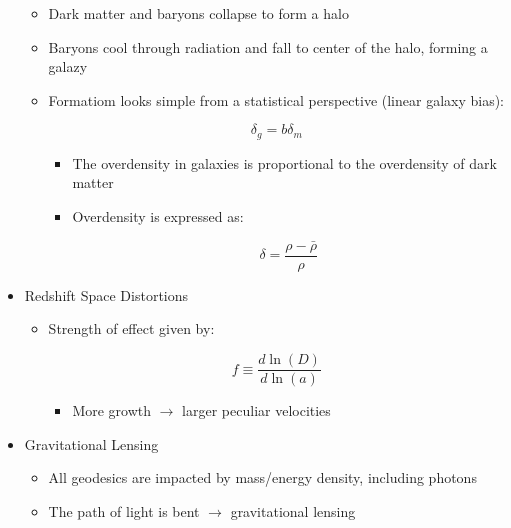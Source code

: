 \begin{itemize}
\begin{itemize}
      \item Dark matter and baryons collapse to form a halo

      \item Baryons cool through radiation and fall to center of the halo, forming a galazy

      \item Formatiom looks simple from a statistical perspective (linear galaxy bias):

        $$\delta_g=b\delta_m$$

        \begin{itemize}

          \item The overdensity in galaxies is proportional to the overdensity of dark matter

          \item Overdensity is expressed as:

            $$\delta=\frac{\rho-\bar{\rho}}{\rho}$$

        \end{itemize}

    \end{itemize}

  \item Redshift Space Distortions

    \begin{itemize}

      \item Strength of effect given by:

        $$f\equiv \frac{d\ln(D)}{d\ln(a)}$$

        \begin{itemize}

          \item More growth $\to$ larger peculiar velocities

        \end{itemize}

    \end{itemize}

  \item Gravitational Lensing

    \begin{itemize}

      \item All geodesics are impacted by mass/energy density, including photons

      \item The path of light is bent $\to$ gravitational lensing


\end{itemize}
\end{itemize}
